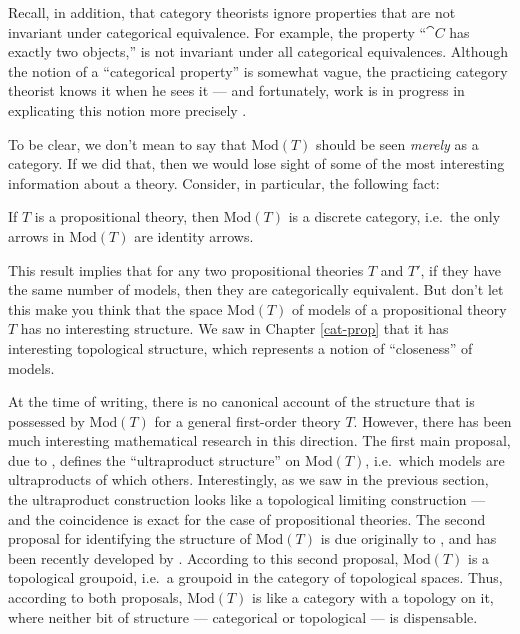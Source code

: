 Recall, in addition, that category theorists ignore properties that
are not invariant under categorical equivalence.  For example, the
property ``$\cat{C}$ has exactly two objects,'' is not invariant under
all categorical equivalences.  Although the notion of a ``categorical
property'' is somewhat vague, the practicing category theorist knows
it when he sees it --- and fortunately, work is in progress in
explicating this notion more precisely
\citep[see][]{makkai-folds,dimitris-folds}.
  
To be clear, we don't mean to say that $\mathrm{Mod}(T)$ should be
seen {\it merely} as a category.  If we did that, then we would lose
sight of some of the most interesting information about a theory.
Consider, in particular, the following fact:

\begin{prop} If $T$ is a propositional theory, then $\mathrm{Mod}(T)$
  is a discrete category, i.e.\ the only arrows in $\mathrm{Mod}(T)$
  are identity arrows. \end{prop} This result implies that for any two
propositional theories $T$ and $T'$, if they have the same number of
models, then they are categorically equivalent.  But don't let this
make you think that the space $\mathrm{Mod}(T)$ of models of a
propositional theory $T$ has no interesting structure.  We saw in
Chapter \ref{cat-prop} that it has interesting topological structure,
which represents a notion of ``closeness'' of models.

At the time of writing, there is no canonical account of the structure
that is possessed by $\mathrm{Mod}(T)$ for a general first-order
theory $T$.  However, there has been much interesting mathematical
research in this direction.  The first main proposal, due to
\cite{makkai-up}, defines the ``ultraproduct structure'' on
$\mathrm{Mod}(T)$, i.e.\ which models are ultraproducts of which
others.  Interestingly, as we saw in the previous section, the
ultraproduct construction looks like a topological limiting
construction --- and the coincidence is exact for the case of
propositional theories.  The second proposal for identifying the
structure of $\mathrm{Mod}(T)$ is due originally to \cite{butz}, and
has been recently developed by \cite{awodey}.  According to this
second proposal, $\mathrm{Mod}(T)$ is a topological groupoid, i.e.\ a
groupoid in the category of topological spaces.  Thus, according to
both proposals, $\mathrm{Mod}(T)$ is like a category with a topology
on it, where neither bit of structure --- categorical or topological
--- is dispensable.

